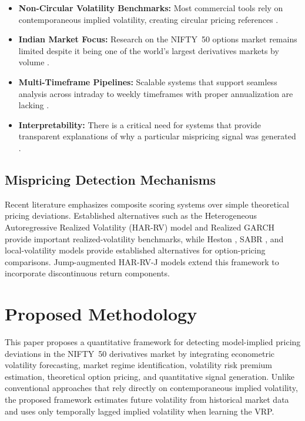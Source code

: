 \documentclass[journal]{IEEEtran}
\begin{document}
\begin{itemize}
  \item \textbf{Non-Circular Volatility Benchmarks:} Most commercial
    tools rely on contemporaneous implied volatility, creating circular
    pricing references \cite{hull2022,nguyen2021}.

  \item \textbf{Indian Market Focus:} Research on the NIFTY~50 options
    market remains limited despite it being one of the world's largest
    derivatives markets by volume \cite{kumar2023,patel2024}.

  \item \textbf{Multi-Timeframe Pipelines:} Scalable systems that
    support seamless analysis across intraday to weekly timeframes with
    proper annualization are lacking \cite{tsay2010}.

  \item \textbf{Interpretability:} There is a critical need for
    systems that provide transparent explanations of why a particular
    mispricing signal was generated \cite{zhang2022}.
\end{itemize}

\subsection{Mispricing Detection Mechanisms}

Recent literature emphasizes composite scoring systems over simple
theoretical pricing deviations. Established alternatives such as the
Heterogeneous Autoregressive Realized Volatility (HAR-RV) model
\cite{corsi2009} and Realized GARCH \cite{realized_garch} provide
important realized-volatility benchmarks, while Heston \cite{heston1993},
SABR \cite{sabr2002}, and local-volatility \cite{dupire1994} models
provide established alternatives for option-pricing comparisons.
Jump-augmented HAR-RV-J models \cite{andersen2007} extend this
framework to incorporate discontinuous return components.

\section{Proposed Methodology}

This paper proposes a quantitative framework for detecting
model-implied pricing deviations in the NIFTY~50 derivatives market by
integrating econometric volatility forecasting, market regime
identification, volatility risk premium estimation, theoretical option
pricing, and quantitative signal generation. Unlike conventional
approaches that rely directly on contemporaneous implied volatility,
the proposed framework estimates future volatility from historical
market data and uses only temporally lagged implied volatility when
learning the VRP.
\end{document}
